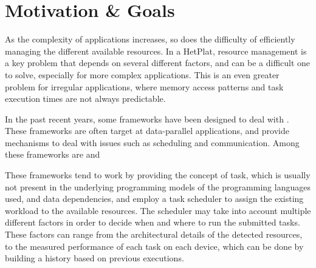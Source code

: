 \documentclass[main.tex]{subfiles}
\begin{document}
\section{Motivation \& Goals}

As the complexity of applications increases, so does the difficulty of efficiently managing the different available resources. In a \ac{HetPlat}, resource management is a key problem that depends on several different factors, and can be a difficult one to solve, especially for more complex applications. This is an even greater problem for irregular applications, where memory access patterns and task execution times are not always predictable.

In the past recent years, some frameworks have been designed to deal with \hetplats. These frameworks are often target at data-parallel applications, and provide mechanisms to deal with issues such as scheduling and communication. Among these frameworks are \gama and \starpu {}

These frameworks tend to work by providing the concept of task, which is usually not present in the underlying programming models of the programming languages used, and data dependencies, and employ a task scheduler to assign the existing workload to the available resources.
The scheduler may take into account multiple different factors in order to decide when and where to run the submitted tasks. These factors can range from the architectural details of the detected resources, to the measured performance of each task on each device, which can be done by building a history based on previous executions.
\end{document}
